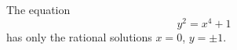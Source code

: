 \begin{proposition}\label{eq:141}
    The equation
\[
    y^2=x^4+1
\]
    has only the rational solutions $x=0$, $y=\pm1$.
\end{proposition}
